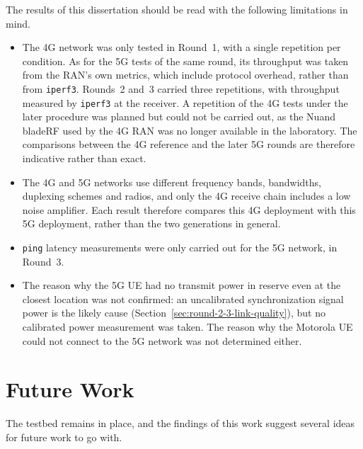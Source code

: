 The results of this dissertation should be read with the following limitations in mind.

\begin{itemize}
    \item The 4G network was only tested in Round~1, with a single repetition per condition. As for the 5G tests of the same round, its throughput was taken from the \gls{RAN}'s own metrics, which include protocol overhead, rather than from \texttt{iperf3}. Rounds~2 and~3 carried three repetitions, with throughput measured by \texttt{iperf3} at the receiver. A repetition of the 4G tests under the later procedure was planned but could not be carried out, as the Nuand bladeRF used by the 4G \gls{RAN} was no longer available in the laboratory. The comparisons between the 4G reference and the later 5G rounds are therefore indicative rather than exact.

    \item The 4G and 5G networks use different frequency bands, bandwidths, duplexing schemes and radios, and only the 4G receive chain includes a low noise amplifier. Each result therefore compares this 4G deployment with this 5G deployment, rather than the two generations in general.
    
    \item \texttt{ping} latency measurements were only carried out for the 5G network, in Round~3.
    
    \item The reason why the 5G \gls{UE} had no transmit power in reserve even at the closest location was not confirmed: an uncalibrated synchronization signal power is the likely cause (Section~\ref{sec:round-2-3-link-quality}), but no calibrated power measurement was taken. The reason why the Motorola \gls{UE} could not connect to the 5G network was not determined either.

\end{itemize}

\section{Future Work}
\label{sec:conclusions-future}

The testbed remains in place, and the findings of this work suggest several ideas for future work to go with.

